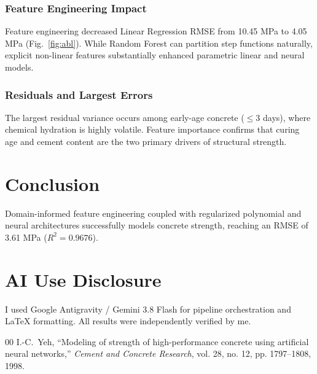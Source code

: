 \documentclass[10pt,journal,compsoc,twocolumn]{IEEEtran}
\begin{document}
\subsubsection{Feature Engineering Impact}
Feature engineering decreased Linear Regression RMSE from 10.45 MPa to 4.05 MPa (Fig.~\ref{fig:abl}). While Random Forest can partition step functions naturally, explicit non-linear features substantially enhanced parametric linear and neural models.

\subsubsection{Residuals and Largest Errors}
The largest residual variance occurs among early-age concrete ($\le 3$ days), where chemical hydration is highly volatile. Feature importance confirms that curing age and cement content are the two primary drivers of structural strength.

\section{Conclusion}
Domain-informed feature engineering coupled with regularized polynomial and neural architectures successfully models concrete strength, reaching an RMSE of 3.61 MPa ($R^2 = 0.9676$).

\section*{AI Use Disclosure}
I used Google Antigravity / Gemini 3.8 Flash for pipeline orchestration and LaTeX formatting. All results were independently verified by me.

\begin{thebibliography}{00}
I.-C.~Yeh, ``Modeling of strength of high-performance concrete using artificial neural networks,'' \textit{Cement and Concrete Research}, vol. 28, no. 12, pp. 1797--1808, 1998.
\end{thebibliography}
\end{document}

